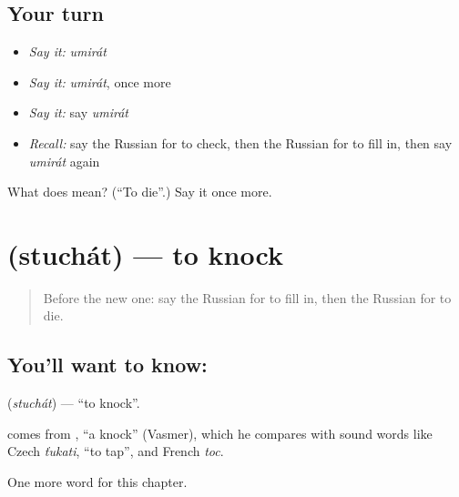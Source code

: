 \subsection*{Your turn}
\begin{itemize}
\raggedright
  \item \emph{Say it:} \emph{umirát}
  \item \emph{Say it:} \emph{umirát}, once more
  \item \emph{Say it:} say \emph{umirát}
  \item \emph{Recall:} say the Russian for to check, then the Russian for to fill in, then say \emph{umirát} again
\end{itemize}

\begin{tcolorbox}[breakable,colback=teal!4,colframe=teal!35!black,title={Before you move on}]
What does  mean? (\textquotedblleft{}To die\textquotedblright{}.) Say it once more.
\end{tcolorbox}
\section[\texorpdfstring{\ru{стучать} (stuchát)}{стучать (stuchát)}]{ (stuchát) — to knock}

\label{lesson:RU-C237-stuchat}



\begin{quote}
Before the new one: say the Russian for to fill in, then the Russian for to die.
\end{quote}

\subsection*{You'll want to know: }
\textbf{} (\emph{stuchát}) — \textquotedblleft{}to knock\textquotedblright{}.

\begin{cousinweb}
\textbf{} comes from \emph{}, \textquotedblleft{}a knock\textquotedblright{} (Vasmer), which he compares with sound words like Czech \emph{ťukati}, \textquotedblleft{}to tap\textquotedblright{}, and French \emph{toc}.
\end{cousinweb}

\begin{grammarlens}[title={What you've built}]
One more word for this chapter.
\end{grammarlens}

